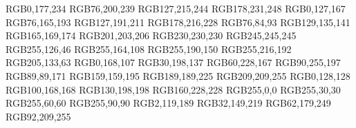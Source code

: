 \usepackage{xcolor}									%
\usepackage{color} 									%

\definecolor{blue1}		{RGB}{0,177,234}				%
\definecolor{blue2}		{RGB}{76,200,239}				%
\definecolor{blue3}		{RGB}{127,215,244}				%
\definecolor{blue4}		{RGB}{178,231,248}				%
\definecolor{bluegray1}	{RGB}{0,127,167}				%
\definecolor{bluegray2}	{RGB}{76,165,193}				%
\definecolor{bluegray3}	{RGB}{127,191,211}				%
\definecolor{bluegray4}	{RGB}{178,216,228}				%
\definecolor{gray1}		{RGB}{76,84,93}				%
\definecolor{gray2}		{RGB}{129,135,141}				%
\definecolor{gray3}		{RGB}{165,169,174}				%
\definecolor{gray4}		{RGB}{201,203,206}				%
\definecolor{gray5}		{RGB}{230,230,230}				%
\definecolor{gray6}		{RGB}{245,245,245}				%
\definecolor{orange1}	{RGB}{255,126,46}				%
\definecolor{orange2}	{RGB}{255,164,108}				%
\definecolor{orange3}	{RGB}{255,190,150}				%
\definecolor{orange4}	{RGB}{255,216,192}				%
\definecolor{brown1}		{RGB}{205,133,63}				%
\definecolor{green1}		{RGB}{0,168,107}				%
\definecolor{green2}		{RGB}{30,198,137}				%
\definecolor{green3}		{RGB}{60,228,167}				%
\definecolor{green4}		{RGB}{90,255,197}				%
\definecolor{purple1}		{RGB}{89,89,171}				%
\definecolor{purple2}		{RGB}{159,159,195}				%
\definecolor{purple3}		{RGB}{189,189,225}				%
\definecolor{purple4}		{RGB}{209,209,255}				%
\definecolor{teal1}		{RGB}{0,128,128}				%
\definecolor{teal2}		{RGB}{100,168,168}				%
\definecolor{teal3}		{RGB}{130,198,198}				%
\definecolor{teal4}		{RGB}{160,228,228}				%
\definecolor{red1}		{RGB}{255,0,0}					%
\definecolor{red2}		{RGB}{255,30,30}				%
\definecolor{red3}		{RGB}{255,60,60}				%
\definecolor{red4}		{RGB}{255,90,90}				%
\definecolor{royal1}		{RGB}{2,119,189}				%
\definecolor{royal2}		{RGB}{32,149,219}				%
\definecolor{royal3}		{RGB}{62,179,249}				%
\definecolor{royal4}		{RGB}{92,209,255}				%

\def\smallopacity	{0.7}								%
\def\bigopacity		{0.5}								%
\def\verybigopacity	{0.3}								%

